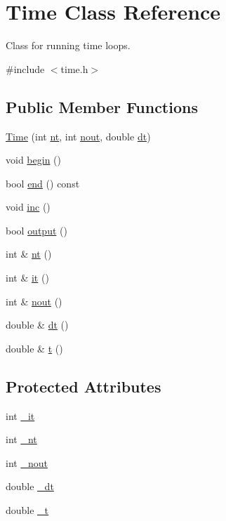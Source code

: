 \hypertarget{class_time}{}\section{Time Class Reference}
\label{class_time}


Class for running time loops.  




{\ttfamily \#include $<$time.\+h$>$}

\subsection*{Public Member Functions}
\begin{DoxyCompactItemize}
\item 
\hyperlink{class_time_a061dce41044220b18a72cc7bf97f9292}{Time} (int \hyperlink{class_time_a5531904db2f9c1d235541f9ca7fd2d4c}{nt}, int \hyperlink{class_time_acd1a70038dd64fa66b78d485e7ba336b}{nout}, double \hyperlink{class_time_aa47c036756e0674b0bb0ca4018a51e72}{dt})
\item 
void \hyperlink{class_time_ae97106319f88a7a473cd65e18d8636a4}{begin} ()
\item 
bool \hyperlink{class_time_acb5e70831abf1bfe9754d178a31993ab}{end} () const 
\item 
void \hyperlink{class_time_a7525e86315b53c419af314d7be541b2f}{inc} ()
\item 
bool \hyperlink{class_time_a427e593bd1fa2a520fb3a10316b65976}{output} ()
\item 
int \& \hyperlink{class_time_a5531904db2f9c1d235541f9ca7fd2d4c}{nt} ()
\item 
int \& \hyperlink{class_time_a1904b7d364082f3e9a3e5661d9c54693}{it} ()
\item 
int \& \hyperlink{class_time_acd1a70038dd64fa66b78d485e7ba336b}{nout} ()
\item 
double \& \hyperlink{class_time_aa47c036756e0674b0bb0ca4018a51e72}{dt} ()
\item 
double \& \hyperlink{class_time_ab2b34172745cdd6363064d0fc3a4a55c}{t} ()
\end{DoxyCompactItemize}
\subsection*{Protected Attributes}
\begin{DoxyCompactItemize}
\item 
int \hyperlink{class_time_a3c9e1bfeb4011d025e13822cb5f5c505}{\+\_\+it}
\item 
int \hyperlink{class_time_a280ffde054834baa2dd58b9faa745fb9}{\+\_\+nt}
\item 
int \hyperlink{class_time_a587de2dad9055fd5600a932ec6a38b4e}{\+\_\+nout}
\item 
double \hyperlink{class_time_ac5b122ce34cac3661357f0d3a7883771}{\+\_\+dt}
\item 
double \hyperlink{class_time_a4ee3f4042a1b37b86c3ae7c8bc3a036e}{\+\_\+t}
\end{DoxyCompactItemize}


